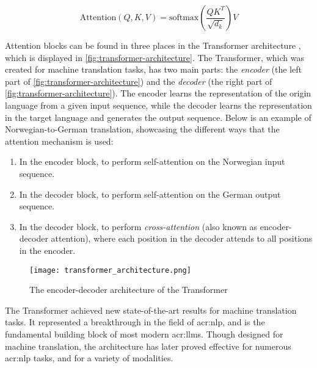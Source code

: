 \begin{equation}
    \text{Attention}(Q, K, V) = \text{softmax}\left(\frac{QK^T}{\sqrt{d_k}}\right)V
    \label{eq:attention}
\end{equation}


Attention blocks can be found in three places in the Transformer architecture \citep[5]{vaswaniAttentionAllYou2017}, which is displayed in \autoref{fig:transformer-architecture}. The Transformer, which was created for machine translation tasks, has two main parts: the \textit{encoder} (the left part of \autoref{fig:transformer-architecture}) and the \textit{decoder} (the right part of \autoref{fig:transformer-architecture}). The encoder learns the representation of the origin language from a given input sequence, while the decoder learns the representation in the target language and generates the output sequence. Below is an example of Norwegian-to-German translation, showcasing the different ways that the attention mechanism is used:

\begin{enumerate}
    \item In the encoder block, to perform self-attention on the Norwegian input sequence.
    \item In the decoder block, to perform self-attention on the German output sequence.
    \item In the decoder block, to perform \textit{cross-attention} (also known as encoder-decoder attention), where each position in the decoder attends to all positions in the encoder.
\end{enumerate}

\begin{figure}
    \centering
    \texttt{[image: transformer\_architecture.png]}
    \caption[The encoder-decoder architecture of the Transformer]{The encoder-decoder architecture of the Transformer \citep[3]{vaswaniAttentionAllYou2017}}
    \label{fig:transformer-architecture}
\end{figure}

The Transformer achieved new state-of-the-art results for machine translation tasks. It represented a breakthrough in the field of \gls{acr:nlp}, and is the fundamental building block of most modern \glspl{acr:llm}. Though designed for machine translation, the architecture has later proved effective for numerous \acrshort{acr:nlp} tasks, and for a variety of modalities.


